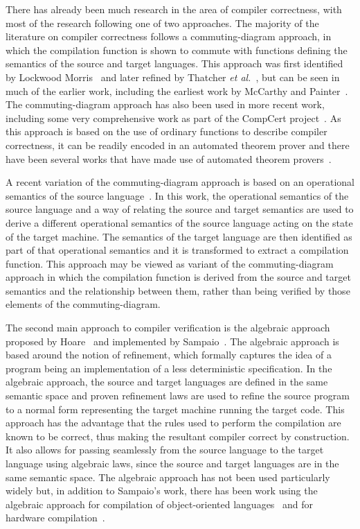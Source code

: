 \documentclass[a4paper,10pt]{report}
\begin{document}
There has already been much research in the area of compiler
correctness, with most of the research following one of two
approaches.
The majority of the literature on compiler correctness follows a
commuting-diagram approach, in which the compilation function is shown
to commute with functions defining the semantics of the source and
target languages.
This approach was first identified by Lockwood
Morris~\cite{morris1973} and later refined by Thatcher \emph{et
  al.}~\cite{thatcher1979}, but can be seen in much of the earlier
work, including the earliest work by McCarthy and
Painter~\cite{mccarthy1967}.
The commuting-diagram approach has also been used in more recent work,
including some very comprehensive work as part of the CompCert
project~\cite{leroy2009a, leroy2009b}.
As this approach is based on the use of ordinary functions to describe
compiler correctness, it can be readily encoded in an automated
theorem prover and there have been several works that have made use of
automated theorem provers~\cite{klein2006, milner1972, nipkow2000}.

A recent variation of the commuting-diagram approach is based on an
operational semantics of the source language~\cite{bahr2015}.
In this work, the operational semantics of the source language and a
way of relating the source and target semantics are used to derive a
different operational semantics of the source language acting on the
state of the target machine.
The semantics of the target language are then identified as part of
that operational semantics and it is transformed to extract a
compilation function.
This approach may be viewed as variant of the commuting-diagram
approach in which the compilation function is derived from the source
and target semantics and the relationship between them, rather than
being verified by those elements of the commuting-diagram.

The second main approach to compiler verification is the algebraic
approach proposed by Hoare~\cite{hoare1991} and implemented by
Sampaio~\cite{hoare1993, sampaio1993}.
The algebraic approach is based around the notion of refinement, which
formally captures the idea of a program being an implementation of a
less deterministic specification.
In the algebraic approach, the source and target languages are defined
in the same semantic space and proven refinement laws are used to
refine the source program to a normal form representing the target
machine running the target code.
This approach has the advantage that the rules used to perform the
compilation are known to be correct, thus making the resultant
compiler correct by construction.
It also allows for passing seamlessly from the source language to the
target language using algebraic laws, since the source and target
languages are in the same semantic space.
The algebraic approach has not been used particularly widely but, in
addition to Sampaio's work, there has been work using the algebraic
approach for compilation of object-oriented languages~\cite{duran2005,
  duran2010} and for hardware compilation~\cite{perna2010, perna2011}.
\end{document}
